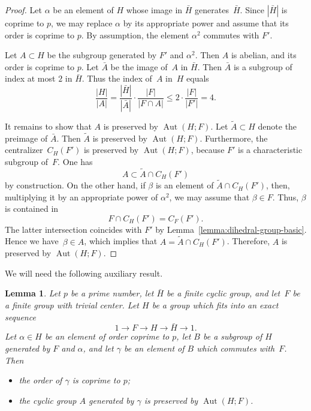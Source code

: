 \documentclass[12pt]{amsart}
\numberwithin{equation}{section}
\newtheorem{lemma}[subsection]{Lemma}
\theoremstyle{definition}
\DeclareMathOperator{\Aut}{Aut}
\def \le {\leqslant}
\begin{document}
\begin{proof}
Let $\alpha$ be an element of $H$ whose image in $\bar{H}$ generates~$\bar{H}$.
Since $|\bar{H}|$ is coprime to $p$, we may replace $\alpha$ by its appropriate power and assume that its order is coprime to $p$.
By assumption, the element $\alpha^2$ commutes with $F'$.

Let $A\subset H$ be the subgroup generated by $F'$ and $\alpha^2$. Then $A$ is abelian, and its order is coprime to $p$.
Let $\bar{A}$ be the image of~$A$ in $\bar{H}$.
Then $\bar{A}$ is a subgroup of index at most $2$ in $\bar{H}$.
Thus the index of~$A$ in~$H$ equals
$$
\frac{|H|}{|A|}=\frac{|\bar{H}|}{|\bar{A}|}\cdot \frac{|F|}{|F\cap A|}\le 2\cdot \frac{|F|}{|F'|}=4.
$$

It remains to show that $A$ is preserved by $\Aut(H;F)$.
Let $\tilde{A}\subset H$ denote the preimage of $\bar{A}$. Then
$\tilde{A}$ is preserved by $\Aut(H;F)$.
Furthermore, the centralizer~$C_H(F')$
is preserved by $\Aut(H;F)$, because $F'$ is a characteristic
subgroup of~$F$. One has
$$
A\subset \tilde{A}\cap C_H(F')
$$
by construction. On the other hand, if $\beta$ is an element
of $\tilde{A}\cap C_H(F')$, then, multiplying it by an appropriate power of $\alpha^2$, we may assume that $\beta\in F$. Thus, $\beta$ is contained in
$$
F\cap C_H(F')=C_F(F').
$$
The latter intersection coincides with $F'$ by Lemma~\ref{lemma:dihedral-group-basic}.
Hence we have~\mbox{$\beta\in A$}, which implies that
$A=\tilde{A}\cap C_H(F')$. Therefore, $A$ is preserved by $\Aut(H;F)$.
\end{proof}

We will need the following auxiliary result.

\begin{lemma}\label{lemma:extension-auxiliary}
Let $p$ be a prime number, let $\bar{H}$ be a finite cyclic group,
and let~$F$ be a finite group with trivial center. Let $H$ be a group which fits into an exact sequence
$$
1\to F\to H\to \bar{H}\to 1.
$$
Let $\alpha\in H$ be an element of order coprime to $p$, let $B$ be a subgroup
of $H$ generated by $F$ and $\alpha$, and let $\gamma$ be an element of $B$
which commutes with~$F$.
Then
\begin{itemize}
\item[(i)] the order of $\gamma$ is coprime to $p$;

\item[(ii)] the cyclic group $A$ generated by $\gamma$ is
preserved by $\Aut(H;F)$.
\end{itemize}
\end{lemma}
\end{document}
